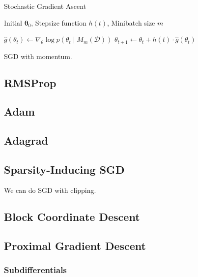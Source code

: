   \begin{algorithm}
    \caption{Stochastic Gradient Ascent}\label{alg:sgd}
    \begin{algorithmic}

    \Require Initial $\boldsymbol{\theta}_0$, Stepsize function $h(t)$, Minibatch size $m$

        \State $\hat{g}(\theta_t) \gets \nabla_\theta \log{p(\theta_t \mid M_m(\mathcal{D}))}$
        \State $\theta_{t+1} \gets \theta_t + h(t) \cdot \hat{g}(\theta_t)$
    \EndFor

    \end{algorithmic}
  \end{algorithm}

  SGD with momentum. 

\subsection{RMSProp} 

\subsection{Adam} 

\subsection{Adagrad}

\subsection{Sparsity-Inducing SGD} 

  We can do SGD with clipping. 

\subsection{Block Coordinate Descent} 

\subsection{Proximal Gradient Descent}

  \subsubsection{Subdifferentials}

